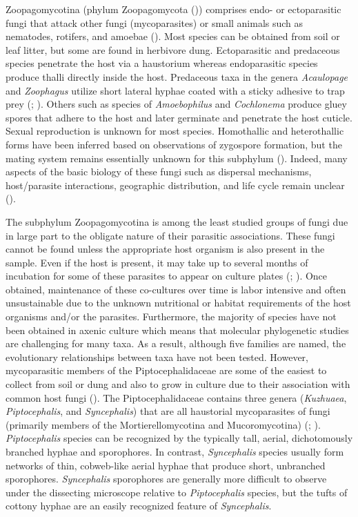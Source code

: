 \documentclass[]{book}
\begin{document}
Zoopagomycotina (phylum Zoopagomycota (\citet{Spatafora_2016}))
comprises endo- or ectoparasitic fungi that attack other fungi
(mycoparasites) or small animals such as nematodes, rotifers, and
amoebae (\citet{Hibbett_2007}). Most species can be obtained from soil
or leaf litter, but some are found in herbivore dung. Ectoparasitic and
predaceous species penetrate the host via a haustorium whereas
endoparasitic species produce thalli directly inside the host.
Predaceous taxa in the genera \emph{Acaulopage} and \emph{Zoophagus}
utilize short lateral hyphae coated with a sticky adhesive to trap prey
(\citet{Drechsler_1935}; \citet{Sommerstorff_1911}). Others such as
species of \emph{Amoebophilus} and \emph{Cochlonema} produce gluey
spores that adhere to the host and later germinate and penetrate the
host cuticle. Sexual reproduction is unknown for most species.
Homothallic and heterothallic forms have been inferred based on
observations of zygospore formation, but the mating system remains
essentially unknown for this subphylum (\citet{Benjamin_1979}). Indeed,
many aspects of the basic biology of these fungi such as dispersal
mechanisms, host/parasite interactions, geographic distribution, and
life cycle remain unclear (\citet{Benny_2016}).

The subphylum Zoopagomycotina is among the least studied groups of fungi
due in large part to the obligate nature of their parasitic
associations. These fungi cannot be found unless the appropriate host
organism is also present in the sample. Even if the host is present, it
may take up to several months of incubation for some of these parasites
to appear on culture plates (\citet{Drechsler_1938};
\citet{Duddington_1955}). Once obtained, maintenance of these
co-cultures over time is labor intensive and often unsustainable due to
the unknown nutritional or habitat requirements of the host organisms
and/or the parasites. Furthermore, the majority of species have not been
obtained in axenic culture which means that molecular phylogenetic
studies are challenging for many taxa. As a result, although five
families are named, the evolutionary relationships between taxa have not
been tested. However, mycoparasitic members of the Piptocephalidaceae
are some of the easiest to collect from soil or dung and also to grow in
culture due to their association with common host fungi
(\citet{Benny_2016}). The Piptocephalidaceae contains three genera
(\emph{Kuzhuaea}, \emph{Piptocephalis}, and \emph{Syncephalis}) that are
all haustorial mycoparasites of fungi (primarily members of the
Mortierellomycotina and Mucoromycotina) (\citet{Benjamin_1979};
\citet{Benny_2005}). \emph{Piptocephalis} species can be recognized by
the typically tall, aerial, dichotomously branched hyphae and
sporophores. In contrast, \emph{Syncephalis} species usually form
networks of thin, cobweb-like aerial hyphae that produce short,
unbranched sporophores. \emph{Syncephalis} sporophores are generally
more difficult to observe under the dissecting microscope relative to
\emph{Piptocephalis} species, but the tufts of cottony hyphae are an
easily recognized feature of \emph{Syncephalis}.
\end{document}

